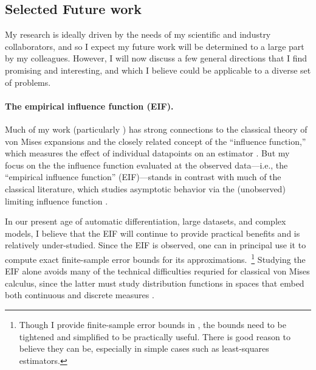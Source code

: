 
\clearpage
\subsection*{Selected Future work}

My research is ideally driven by the needs of my scientific and industry
collaborators, and so I expect my future work will be determined to a large part
by my colleagues.  However, I will now discuss a few
general directions that I find promising and interesting, and which I believe
could be applicable to a diverse set of problems.


\paragraph{The empirical influence function (EIF).}

Much of my work (particularly \citet{giordano:2019:ij, giordano:2020:amip,
giordano:2021:bayesij}) has strong connections to the classical theory of von
Mises expansions and the closely related concept of the ``influence function,''
which measures the effect of individual datapoints on an estimator
\citep{mises:1947:asymptotic, reeds:1976:thesis, hampel:1986:robustbook,
serfling:2009:approximation}.  But my focus on the the influence function
evaluated at the observed data---i.e., the ``empirical influence function''
(EIF)---stands in contrast with much of the classical literature, which studies
asymptotic behavior via the (unobserved) limiting influence function .

In our present age of automatic differentiation, large datasets, and complex
models, I believe that the EIF will continue to provide practical benefits and
is relatively under-studied.  Since the EIF is observed, one can in principal
use it to compute exact finite-sample error bounds for its
approximations.~\footnote{Though I provide finite-sample error bounds in
\citet{giordano:2019:ij, giordano:2019:hoij}, the bounds need to be tightened
and simplified to be practically useful.  There is good reason to believe they
can be, especially in simple cases such as least-squares estimators.} Studying
the EIF alone avoids many of the technical difficulties requried for classical
von Mises calculus, since the latter must study distribution functions in spaces
that embed both continuous and discrete measures \citep{gill:1989:mises}.


